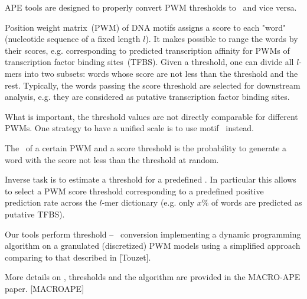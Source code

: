 APE tools are designed to properly convert PWM thresholds to \pvalues\ and vice versa.

Position weight matrix~(PWM) of DNA motifs assigns a score to each "word" (nucleotide sequence of a fixed length $l$). It makes 
possible to range the words by their scores, e.g. corresponding to predicted transcription affinity for PWMs of transcription factor binding sites~(TFBS). Given a threshold, one can divide all $l$-mers into two subsets: words whose score are not less than the threshold and the rest. Typically, the words passing the score threshold are selected for downstream analysis, e.g. they are considered as putative transcription factor binding sites. 

What is important, the threshold values are not directly comparable for different PWMs. One strategy to have a unified scale is to use motif \pvalues\ instead.

The \pvalue\ of a certain PWM and a score threshold is the probability to generate a word with the score not less than the threshold at random.

Inverse task is to estimate a threshold for a predefined \pvalue. In particular this allows to select a PWM score threshold corresponding to a predefined positive prediction rate across the $l$-mer dictionary (e.g. only $x\%$ of words are predicted as putative TFBS).

Our tools perform threshold -- \pvalue\ conversion implementing a dynamic programming algorithm on a granulated (discretized) PWM models using a simplified approach comparing to that described in [Touzet].

More details on \pvalues, thresholds and the algorithm are provided in the MACRO-APE paper. [MACROAPE] 
